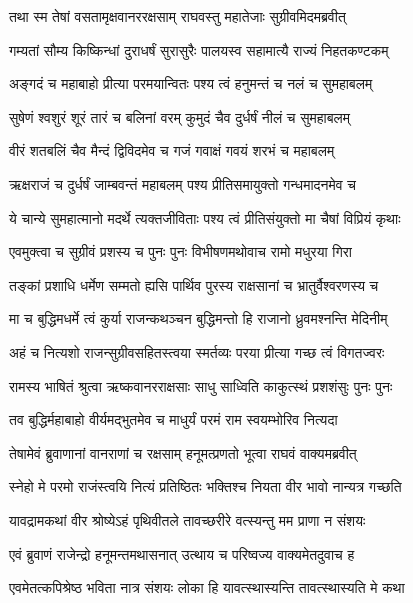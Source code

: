 \twolineshloka
{तथा स्म तेषां वसतामृक्षवानररक्षसाम्}
{राघवस्तु महातेजाः सुग्रीवमिदमब्रवीत्} %

\twolineshloka
{गम्यतां सौम्य किष्किन्धां दुराधर्षं सुरासुरैः}
{पालयस्व सहामात्यै राज्यं निहतकण्टकम्} %

\twolineshloka
{अङ्गदं च महाबाहो प्रीत्या परमयान्वितः}
{पश्य त्वं हनुमन्तं च नलं च सुमहाबलम्} %

\twolineshloka
{सुषेणं श्वशुरं शूरं तारं च बलिनां वरम्}
{कुमुदं चैव दुर्धर्षं नीलं च सुमहाबलम्} %

\twolineshloka
{वीरं शतबलिं चैव मैन्दं द्विविदमेव च}
{गजं गवाक्षं गवयं शरभं च महाबलम्} %

\twolineshloka
{ऋक्षराजं च दुर्धर्षं जाम्बवन्तं महाबलम्}
{पश्य प्रीतिसमायुक्तो गन्धमादनमेव च} %

\twolineshloka
{ये चान्ये सुमहात्मानो मदर्थे त्यक्तजीविताः}
{पश्य त्वं प्रीतिसंयुक्तो मा चैषां विप्रियं कृथाः} %

\twolineshloka
{एवमुक्त्वा च सुग्रीवं प्रशस्य च पुनः पुनः}
{विभीषणमथोवाच रामो मधुरया गिरा} %

\twolineshloka
{तङ्कां प्रशाधि धर्मेण सम्मतो ह्यसि पार्थिव}
{पुरस्य राक्षसानां च भ्रातुर्वैश्वरणस्य च} %

\twolineshloka
{मा च बुद्धिमधर्मे त्वं कुर्या राजन्कथञ्चन}
{बुद्धिमन्तो हि राजानो ध्रुवमश्नन्ति मेदिनीम्} %

\twolineshloka
{अहं च नित्यशो राजन्सुग्रीवसहितस्त्वया}
{स्मर्तव्यः परया प्रीत्या गच्छ त्वं विगतज्वरः} %

\twolineshloka
{रामस्य भाषितं श्रुत्वा ऋष्कवानरराक्षसाः}
{साधु साध्विति काकुत्स्थं प्रशशंसुः पुनः पुनः} %

\twolineshloka
{तव बुद्धिर्महाबाहो वीर्यमद्भुतमेव च}
{माधुर्यं परमं राम स्वयम्भोरिव नित्यदा} %

\twolineshloka
{तेषामेवं ब्रुवाणानां वानराणां च रक्षसाम्}
{हनूमत्प्रणतो भूत्वा राघवं वाक्यमब्रवीत्} %

\twolineshloka
{स्नेहो मे परमो राजंस्त्वयि नित्यं प्रतिष्ठितः}
{भक्तिश्च नियता वीर भावो नान्यत्र गच्छति} %

\twolineshloka
{यावद्रामकथां वीर श्रोष्येऽहं पृथिवीतले}
{तावच्छरीरे वत्स्यन्तु मम प्राणा न संशयः} %

\twolineshloka
{एवं ब्रुवाणं राजेन्द्रो हनूमन्तमथासनात्}
{उत्थाय च परिष्वज्य वाक्यमेतदुवाच ह} %

\twolineshloka
{एवमेतत्कपिश्रेष्ठ भविता नात्र संशयः}
{लोका हि यावत्स्थास्यन्ति तावत्स्थास्यति मे कथा} %

